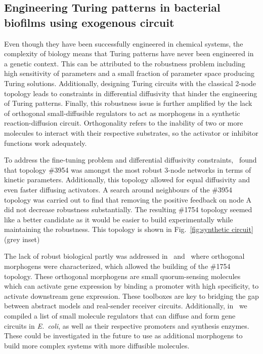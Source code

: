 \subsection{Engineering Turing patterns in bacterial biofilms using exogenous circuit}
Even though they have been successfully engineered in chemical systems, the complexity of biology means that Turing patterns have never been engineered in a genetic context.
This can be attributed to the robustness problem including high sensitivity of parameters and a small fraction of parameter space producing Turing solutions.
Additionally, designing Turing circuits with the classical 2-node topology leads to constraints in differential diffusivity that hinder the engineering of Turing patterns.
Finally, this robustness issue is further amplified by the lack of orthogonal small-diffusible regulators to act as morphogens in a synthetic reaction-diffusion circuit.
Orthogonality refers to the inability of two or more molecules to interact with their respective substrates, so the activator or inhibitor functions work adequately.
%

To address the fine-tuning problem and differential diffusivity constraints,~\cite{Scholes2019} found that topology \#3954 was amongst the most robust 3-node networks in terms of kinetic parameters.
Additionally, this topology allowed for equal diffusivity and even faster diffusing activators.
A search around neighbours of the \#3954 topology was carried out to find that removing the positive feedback on node A did not decrease robustness substantially.
The resulting \#1754 topology seemed like a better candidate as it would be easier to build experimentally while maintaining the robustness.
This topology is shown in Fig.~\ref{fig:synthetic circuit} (grey inset)

The lack of robust biological partly was addressed in~\cite{Meyer2019} and~\cite{Du2020} where orthogonal morphogens were characterized, which allowed the building of the \#1754 topology.
These orthogonal morphogens are small quorum-sensing molecules which can activate gene expression by binding a promoter with high specificity, to activate downstream gene expression.
These toolboxes are key to bridging the gap between abstract models and real-sender receiver circuits.
Additionally, in~\cite{huidobro} we compiled a list of small molecule regulators that can diffuse and form gene circuits in \textit{E.~coli}, as well as their respective promoters and synthesis enzymes.
These could be investigated in the future to use as additional morphogens to build more complex systems with more diffusible molecules.

